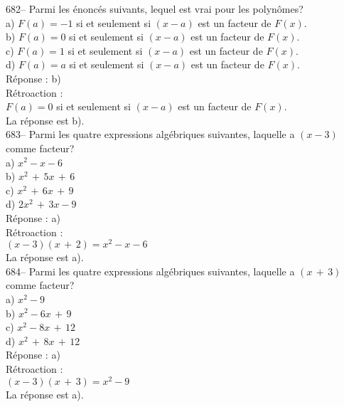 ﻿\documentclass[letterpaper, 12pt]{article}
\begin{document}
682-- Parmi les \'enonc\'es suivants, lequel est vrai pour les polyn\^omes?\\
a)  $F\left( a\right) = -1$ si et seulement si $\left( x-a\right) $
est un
facteur de $F\left( x\right) $.\\
b) $ F\left( a\right) = 0 $ si et seulement si $ \left( x-a\right) $
est un facteur
de $F\left( x\right) $.\\
c) $ F\left( a\right) = 1 $ si et seulement si $ \left( x-a\right) $
est un facteur
de $F\left( x\right) $.\\
d) $ F\left( a\right) = a $ si et seulement si $ \left( x-a\right) $
est un facteur
de $F\left( x\right) $.\\

R\'eponse : b)\\

R\'etroaction : \\
$ F\left( a\right) = 0 $ si et seulement si $ \left( x-a\right) $
est un facteur de
$F\left( x\right) $.\\
La r\'eponse est b).\\

683-- Parmi les quatre expressions alg\'ebriques suivantes, laquelle a
$\left( x-3\right)$ comme facteur?\\
a) $x^{2}-x-6$\\
b) $x^{2}\,+\,5x\,+\,6$\\
c) $x^{2}\,+\,6x\,+\,9$\\
d) $2x^{2}\,+\,3x-9$\\

R\'eponse : a)\\

R\'etroaction : \\
$(x-3)(x\,+\,2)=x^{2}-x-6$\\
La r\'eponse est a).\\

684-- Parmi les quatre expressions alg\'ebriques suivantes, laquelle a
$\left( x\,+\,3\right) $ comme facteur?\\
a) $x^{2}-9$\\
b) $x^{2}-6x\,+\,9$\\
c) $x^{2}-8x\,+\,12$\\
d) $x^{2}\,+\,8x\,+\,12$\\

R\'eponse : a)\\

R\'etroaction : \\
$\left( x-3\right) \left( x\,+\,3\right) = x^{2}-9$\\
La r\'eponse est a).\\
\end{document}
